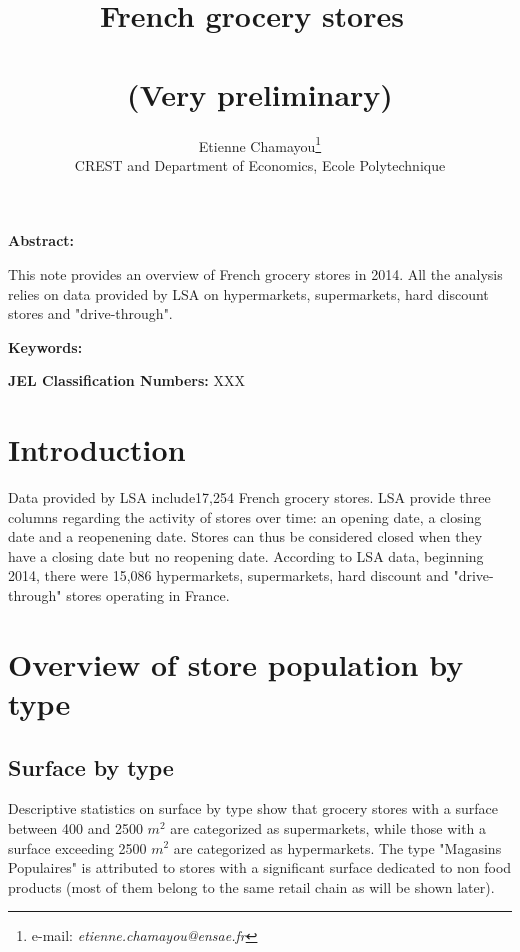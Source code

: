 \documentclass[11pt]{article}
\begin{document}
\title{French grocery stores\ \\ \ \\(Very preliminary)}
\author{Etienne Chamayou\thanks{e-mail:
\textit{etienne.chamayou@ensae.fr}}\medskip\\{\normalsize CREST and Department of Economics, Ecole Polytechnique }}
\maketitle

\sloppy%

\onehalfspacing

\textbf{Abstract:}

This note provides an overview of French grocery stores in 2014. All the analysis relies on data provided by LSA on hypermarkets, supermarkets, hard discount stores and "drive-through".

\strut

\textbf{Keywords:}

\strut

\textbf{JEL Classification Numbers:} XXX

\pagebreak%
\doublespacing

\section{Introduction}

Data provided by LSA include17,254 French grocery stores. LSA provide three columns regarding the activity of stores over time: an opening date, a closing date and a reopenening date. Stores can thus be considered closed when they have a closing date but no reopening date. According to LSA data, beginning 2014, there were 15,086 hypermarkets, supermarkets, hard discount and "drive-through" stores operating in France.



\section{Overview of store population by type}


\subsection{Surface by type}

Descriptive statistics on surface by type show that grocery stores with a surface between 400 and 2500 $m^2$ are categorized as supermarkets, while those with a surface exceeding 2500 $m^2$ are categorized as hypermarkets. The type "Magasins Populaires" is attributed to stores with a significant surface dedicated to non food products (most of them belong to the same retail chain as will be shown later).
\end{document}
